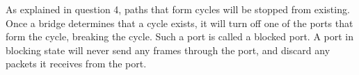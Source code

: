 As explained in question 4, paths that form cycles will be stopped from existing. Once a bridge determines that a cycle exists, it will turn off one of the ports that form the cycle, breaking the cycle. Such a port is called a blocked port. A port in blocking state will never send any frames through the port, and discard any packets it receives from the port.
